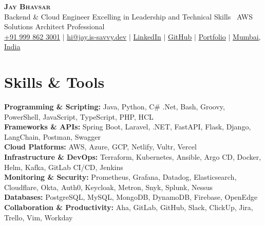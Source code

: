 \documentclass[letterpaper,11pt]{article}
\newcommand{\resumeSubHeadingListStart}{\begin{itemize}[leftmargin=0.15in, label={}]}
\newcommand{\resumeSubHeadingListEnd}{\end{itemize}}
\begin{document}

\begin{center}
  \textbf{\Huge \scshape Jay Bhavsar} \\ \vspace{3pt}
  \normalsize Backend \& Cloud Engineer Excelling in Leadership and Technical Skills \textbar\ AWS Solutions Architect Professional \\ \vspace{3pt}
  \small
  \faMobile \hspace{.5pt} \href{tel:919998623001}{+91 999 862 3001}
  $|$
  \faAt \hspace{.5pt} \href{mailto:hi@jay.is-savvy.dev}{hi@jay.is-savvy.dev}
  $|$
  \faLinkedinSquare \hspace{.5pt} \href{https://www.linkedin.com/in/jbhv12/}{LinkedIn}
  $|$
  \faGithub \hspace{.5pt} \href{https://github.com/jbhv12}{GitHub}
  $|$
  \faGlobe \hspace{.5pt} \href{https://jay.is-savvy.dev/}{Portfolio}
  $|$
  \faMapMarker \hspace{.5pt} \href{https://goo.gl/maps/Czh1vXePukiKumpu5}{Mumbai, India}
\end{center}


\section{Skills \& Tools}
\vspace{2pt}
\resumeSubHeadingListStart
\small{\item{
              \textbf{Programming \& Scripting:}{ Java, Python, C\# .Net, Bash, Groovy, PowerShell, JavaScript, TypeScript, PHP, HCL} \\ \vspace{3pt}
              \textbf{Frameworks \& APIs:}{ Spring Boot, Laravel, .NET, FastAPI, Flask, Django, LangChain, Postman, Swagger} \\ \vspace{3pt}
              \textbf{Cloud Platforms:}{ AWS, Azure, GCP, Netlify, Vultr, Vercel} \\ \vspace{3pt}
              \textbf{Infrastructure \& DevOps:}{ Terraform, Kubernetes, Ansible, Argo CD, Docker, Helm, Kafka, GitLab CI/CD, Jenkins} \\ \vspace{3pt}
              \textbf{Monitoring \& Security:}{ Prometheus, Grafana, Datadog, Elasticsearch, Cloudflare, Okta, Auth0, Keycloak, Metron, Snyk, Splunk, Nessus} \\ \vspace{3pt}
              \textbf{Databases:}{ PostgreSQL, MySQL, MongoDB, DynamoDB, Firebase, OpenEdge} \\ \vspace{3pt}
              \textbf{Collaboration \& Productivity:}{ Aha, GitLab, GitHub, Slack, ClickUp, Jira, Trello, Vim, Workday} \\ \vspace{3pt}
            }}
\resumeSubHeadingListEnd
\end{document}
